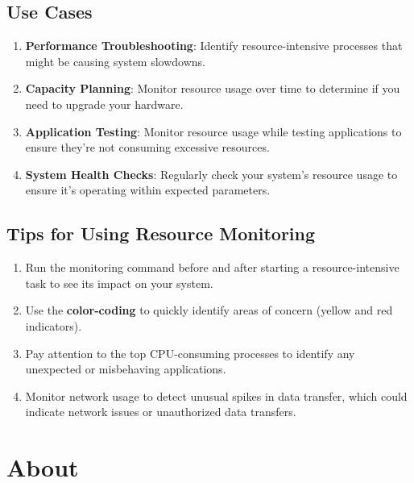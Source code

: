 \documentclass[
  letterpaper,
  DIV=11,
  numbers=noendperiod]{scrreprt}
\providecommand{\tightlist}{%
  \setlength{\itemsep}{0pt}\setlength{\parskip}{0pt}}\usepackage{longtable,booktabs,array}
\begin{document}
\section*{Use Cases}\label{use-cases}


\begin{enumerate}
\def\labelenumi{\arabic{enumi}.}
\tightlist
\item
  \textbf{Performance Troubleshooting}: Identify resource-intensive
  processes that might be causing system slowdowns.
\item
  \textbf{Capacity Planning}: Monitor resource usage over time to
  determine if you need to upgrade your hardware.
\item
  \textbf{Application Testing}: Monitor resource usage while testing
  applications to ensure they're not consuming excessive resources.
\item
  \textbf{System Health Checks}: Regularly check your system's resource
  usage to ensure it's operating within expected parameters.
\end{enumerate}

\section*{Tips for Using Resource
Monitoring}\label{tips-for-using-resource-monitoring}


\begin{enumerate}
\def\labelenumi{\arabic{enumi}.}
\tightlist
\item
  Run the monitoring command before and after starting a
  resource-intensive task to see its impact on your system.
\item
  Use the \textbf{color-coding} to quickly identify areas of concern
  (yellow and red indicators).
\item
  Pay attention to the top CPU-consuming processes to identify any
  unexpected or misbehaving applications.
\item
  Monitor network usage to detect unusual spikes in data transfer, which
  could indicate network issues or unauthorized data transfers.
\end{enumerate}


\chapter*{About}\label{about}
\end{document}
